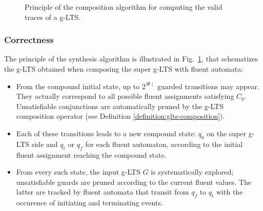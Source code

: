 \begin{figure}
\centering
{}
\caption{Principle of the composition algorithm for computing the valid traces of a g-LTS.\label{image:glts2lts-intuition}}
\end{figure}

\subsubsection*{Correctness}

The principle of the synthesis algorithm is illustrated in Fig.~\ref{image:glts2lts-intuition}, that schematizes the g-LTS obtained when composing the super g-LTS with fluent automata:
\begin{itemize}
\item From the compound initial state, up to $2^{\mid\Phi\mid}$ guarded transitions may appear. They actually correspond to all possible fluent assignments satisfying $C_0$. Unsatisfiable conjunctions are automatically pruned by the g-LTS composition operator (see Definition \ref{definition:glts-composition}).
\item Each of these transitions leads to a new compound state: $q_0$ on the super g-LTS side and $q_t$ or $q_f$ for each fluent automaton, according to the initial fluent assignment reaching the compound state.
\item From every such state, the input g-LTS $G$ is systematically explored; unsatisfiable guards are pruned according to the current fluent values. The latter are tracked by fluent automata that transit from $q_f$ to $q_t$ with the occurence of initiating and terminating events.
\end{itemize}

